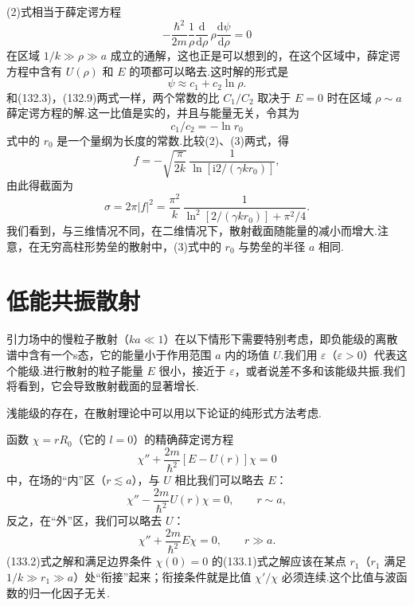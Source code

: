 \begin{xiti}
(2)式相当于薛定谔方程
\begin{equation*}
  -\frac{\hbar^2}{2m}\frac{1}{\rho}
  \frac{\mathrm{d}}{\mathrm{d}\rho}\,
  \rho\frac{\mathrm{d}\psi}{\mathrm{d}\rho}=0
\end{equation*}
在区域 $1/k\gg\rho\gg a$ 成立的通解，这也正是可以想到的，在这个区域中，薛定谔方程中含有 $U(\rho)$ 和 $E$ 的项都可以略去.这时解的形式是
\begin{equation*}
  \psi\approx c_1+c_2\ln\rho.
\end{equation*}
和(132.3)，(132.9)两式一样，两个常数的比 $C_1/C_2$ 取决于 $E=0$ 时在区域 $\rho\sim a$ 薛定谔方程的解.这一比值是实的，并且与能量无关，令其为
\begin{equation}
  c_1/c_2=-\ln r_0
\end{equation}
式中的 $r_0$ 是一个量纲为长度的常数.比较(2)、(3)两式，得
\begin{equation*}
  f=-\sqrt{\frac{\pi}{2k}}\,
  \frac{1}{\ln\left[\mathrm{i}2/(\gamma kr_0)\right]},
\end{equation*}
由此得截面为
\begin{equation}
  \sigma=2\pi|f|^2=\frac{\pi^2}{k}\,
  \frac{1}{\ln^2\left[2/(\gamma kr_0)\right]+\pi^2/4}.
\end{equation}
我们看到，与三维情况不同，在二维情况下，散射截面随能量的减小而增大.注意，在无穷高柱形势垒的散射中，(3)式中的 $r_0$ 与势垒的半径 $a$ 相同.

\end{xiti}
\setcounter{equation}{0}%

\section{低能共振散射}

引力场中的慢粒子散射（$ka\ll1$）在以下情形下需要特别考虑，即负能级的离散谱中含有一个s态，它的能量小于作用范围 $a$ 内的场值 $U$.我们用 $\varepsilon$（$\varepsilon>0$）代表这个能级.进行散射的粒子能量 $E$ 很小，接近于 $\varepsilon$，或者说差不多和该能级共振.我们将看到，它会导致散射截面的显著增长.

浅能级的存在，在散射理论中可以用以下论证的纯形式方法考虑.

函数 $\chi=rR_0$（它的 $l=0$）的精确薛定谔方程
\begin{equation*}
  \chi''+\frac{2m}{\hbar^2}\left[E-U(r)\right]\chi=0
\end{equation*}
中，在场的“内”区（$r\lesssim a$），与 $U$ 相比我们可以略去 $E$：
\begin{equation}
  \chi''-\frac{2m}{\hbar^2}U(r)\chi=0,
  \qquad r\sim a,
\end{equation}
反之，在“外”区，我们可以略去 $U$：
\begin{equation}
  \chi''+\frac{2m}{\hbar^2}E\chi=0,
  \qquad r\gg a.
\end{equation}
(133.2)式之解和满足边界条件 $\chi(0)=0$ 的(133.1)式之解应该在某点 $r_1$（$r_1$ 满足 $1/k\gg r_1\gg a$）处“衔接”起来；衔接条件就是比值 $\chi'/\chi$ 必须连续.这个比值与波函数的归一化因子无关.


